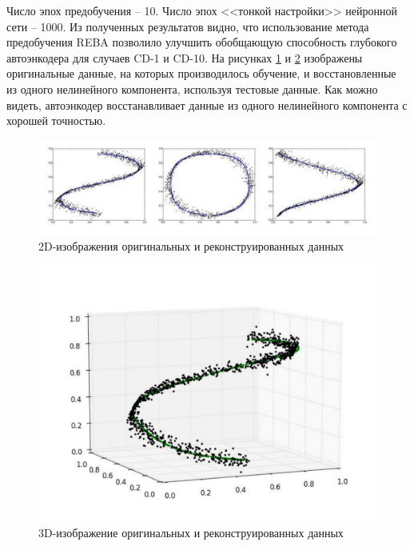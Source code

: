 Число эпох предобучения -- 10. Число эпох <<тонкой настройки>> нейронной сети -- 1000. Из полученных результатов видно, что использование метода предобучения REBA позволило улучшить обобщающую способность глубокого автоэнкодера для случаев CD-1 и CD-10. На рисунках \ref{f:15} и \ref{f:16} изображены оригинальные данные, на которых производилось обучение, и восстановленные из одного нелинейного компонента, используя тестовые данные. Как можно видеть, автоэнкодер восстанавливает данные из одного нелинейного компонента с хорошей точностью.

\begin{figure}[h]
	\begin{center}
		\includegraphics[width=160mm]{man-source/images/ch3/pic3-6.pdf}
		\caption{2D-изображения оригинальных и реконструированных данных}				
		\label{f:15}
	\end{center}
\end{figure}

\begin{figure}[h!]
	\begin{center}
		\includegraphics[width=120mm]{man-source/images/ch3/pic3-7.pdf}
		\caption{3D-изображение оригинальных и реконструированных данных}				
		\label{f:16}
	\end{center}
\end{figure}

